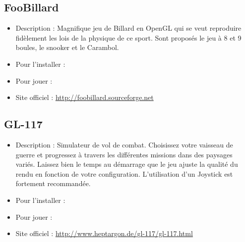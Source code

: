 \subsection{FooBillard}
\begin{itemize}
\begingroup
{}
\item Description : Magnifique jeu de Billard en OpenGL qui se veut reproduire fidèlement les lois de la physique de ce sport.  Sont proposés le jeu à 8 et 9 boules, le snooker et le Carambol.{\par}
\item Pour l'installer : 
\item Pour jouer : 
\item Site officiel : \url{http://foobillard.sourceforge.net}{\par}
\endgroup
\end{itemize}
\subsection{GL-117}
\begin{itemize}
\begingroup
{}
\item Description : Simulateur de vol de combat. Choisissez votre vaisseau de guerre et progressez à travers les différentes missions dans des paysages variés. Laissez bien le temps au démarrage que le jeu ajuste la qualité du rendu en fonction de votre configuration. L'utilisation d'un Joystick est fortement recommandée.{\par}
\item Pour l'installer : 
\item Pour jouer : 
\item Site officiel : \url{http://www.heptargon.de/gl-117/gl-117.html}{\par}
\endgroup
\end{itemize}
